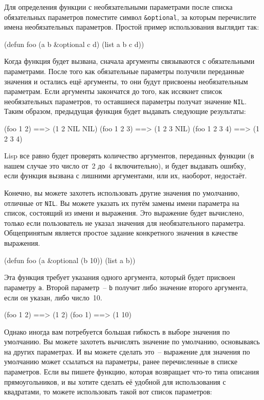 Для определения функции с необязательными параметрами после списка обязательных параметров
поместите символ \lstinline!&optional!, за которым перечислите имена необязательных
параметров.  Простой пример использования выглядит так:

\begin{myverb}
(defun foo (a b &optional c d) 
  (list a b c d))
\end{myverb}

Когда функция будет вызвана, сначала аргументы связываются с обязательными параметрами.
После того как обязательные параметры получили переданные значения и остались ещё
аргументы, то они будут присвоены необязательным параметрам.  Если аргументы закончатся до
того, как иссякнет список необязательных параметров, то оставшиеся параметры получат
значение \lstinline{NIL}.  Таким образом, предыдущая функция будет выдавать следующие
результаты:

\begin{myverb}
(foo 1 2)     ==> (1 2 NIL NIL)
(foo 1 2 3)   ==> (1 2 3 NIL)
(foo 1 2 3 4) ==> (1 2 3 4)
\end{myverb}

Lisp все равно будет проверять количество аргументов, переданных функции (в нашем случае
это число от~2 до~4 включительно), и будет выдавать ошибку, если функция вызвана с
лишними аргументами, или их, наоборот, недостаёт.

Конечно, вы можете захотеть использовать другие значения по умолчанию, отличные от
\lstinline{NIL}.  Вы можете указать их путём замены имени параметра на список, состоящий из
имени и выражения.  Это выражение будет вычислено, только если пользователь не указал
значения для необязательного параметра.  Общепринятым является простое задание конкретного
значения в качестве выражения.

\begin{myverb}
(defun foo (a &optional (b 10)) 
  (list a b))
\end{myverb}

Эта функция требует указания одного аргумента, который будет присвоен параметру \lstinline{a}.
Второй параметр~-- \lstinline{b} получит либо значение второго аргумента, если он указан, либо
число~10.

\begin{myverb}
(foo 1 2) ==> (1 2)
(foo 1)   ==> (1 10)
\end{myverb}

Однако иногда вам потребуется большая гибкость в выборе значения по умолчанию.  Вы
можете захотеть вычислять значение по умолчанию, основываясь на других параметрах.  И вы
можете сделать это~-- выражение для значения по умолчанию может ссылаться на параметры,
ранее перечисленные в списке параметров.  Если вы пишете функцию, которая возвращает
что-то типа описания прямоугольников, и вы хотите сделать её удобной для использования с
квадратами, то можете использовать такой вот список параметров:

